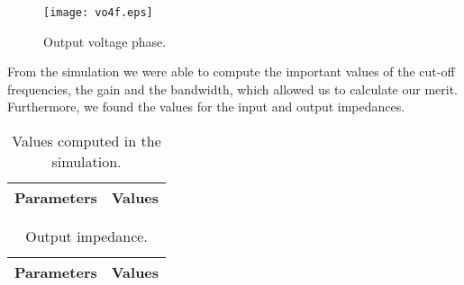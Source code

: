 \begin{figure}[h] \centering
\texttt{[image: vo4f.eps]}
\caption{Output voltage phase.}
\label{fig:s5}
\end{figure}

\vspace{10.0cm}

From the simulation we were able to compute the important values of the cut-off frequencies, the gain and the bandwidth, which allowed us to calculate our merit. Furthermore, we found the values for the input and output impedances.

\begin{table}[h]
  \centering
  \begin{tabular}{|l|r|}
    \hline    
    {\bf Parameters} & {\bf Values} \\ \hline
    
  \end{tabular}
  \caption{Values computed in the simulation.}
  \label{tab:s1}
\end{table}

\begin{table}[h]
  \centering
  \begin{tabular}{|l|r|}
    \hline    
    {\bf Parameters} & {\bf Values} \\ \hline
    
  \end{tabular}
  \caption{Output impedance.}
  \label{tab:s2}
\end{table}


